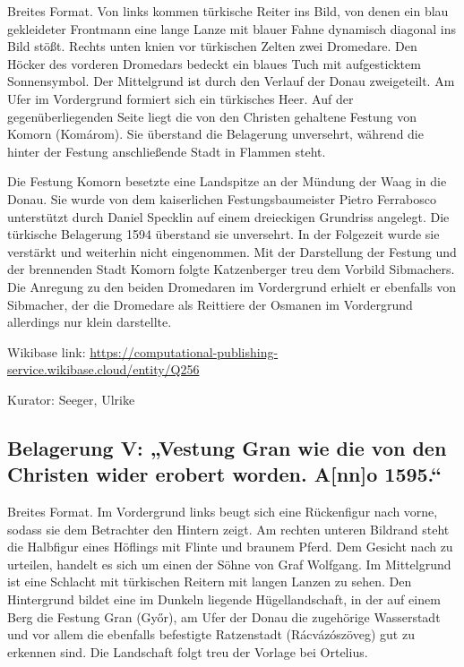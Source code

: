 \documentclass[
  11pt,
  a4paper,
  openany]{book}
\begin{document}
Breites Format. Von links kommen türkische Reiter ins Bild, von denen
ein blau gekleideter Frontmann eine lange Lanze mit blauer Fahne
dynamisch diagonal ins Bild stößt. Rechts unten knien vor türkischen
Zelten zwei Dromedare. Den Höcker des vorderen Dromedars bedeckt ein
blaues Tuch mit aufgesticktem Sonnensymbol. Der Mittelgrund ist durch
den Verlauf der Donau zweigeteilt. Am Ufer im Vordergrund formiert sich
ein türkisches Heer. Auf der gegenüberliegenden Seite liegt die von den
Christen gehaltene Festung von Komorn (Komárom). Sie überstand die
Belagerung unversehrt, während die hinter der Festung anschließende
Stadt in Flammen steht.

Die Festung Komorn besetzte eine Landspitze an der Mündung der Waag in
die Donau. Sie wurde von dem kaiserlichen Festungsbaumeister Pietro
Ferrabosco unterstützt durch Daniel Specklin auf einem dreieckigen
Grundriss angelegt. Die türkische Belagerung 1594 überstand sie
unversehrt. In der Folgezeit wurde sie verstärkt und weiterhin nicht
eingenommen. Mit der Darstellung der Festung und der brennenden Stadt
Komorn folgte Katzenberger treu dem Vorbild Sibmachers. Die Anregung zu
den beiden Dromedaren im Vordergrund erhielt er ebenfalls von Sibmacher,
der die Dromedare als Reittiere der Osmanen im Vordergrund allerdings
nur klein darstellte.

Wikibase link:
\url{https://computational-publishing-service.wikibase.cloud/entity/Q256}

Kurator: Seeger, Ulrike

\subsection{Belagerung V: „Vestung Gran wie die von den Christen wider
erobert worden. A{[}nn{]}o
1595.``}\label{belagerung-v-vestung-gran-wie-die-von-den-christen-wider-erobert-worden.-anno-1595.}

Breites Format. Im Vordergrund links beugt sich eine Rückenfigur nach
vorne, sodass sie dem Betrachter den Hintern zeigt. Am rechten unteren
Bildrand steht die Halbfigur eines Höflings mit Flinte und braunem
Pferd. Dem Gesicht nach zu urteilen, handelt es sich um einen der Söhne
von Graf Wolfgang. Im Mittelgrund ist eine Schlacht mit türkischen
Reitern mit langen Lanzen zu sehen. Den Hintergrund bildet eine im
Dunkeln liegende Hügellandschaft, in der auf einem Berg die Festung Gran
(Győr), am Ufer der Donau die zugehörige Wasserstadt und vor allem die
ebenfalls befestigte Ratzenstadt (Rácvázószöveg) gut zu erkennen sind.
Die Landschaft folgt treu der Vorlage bei Ortelius.
\end{document}
